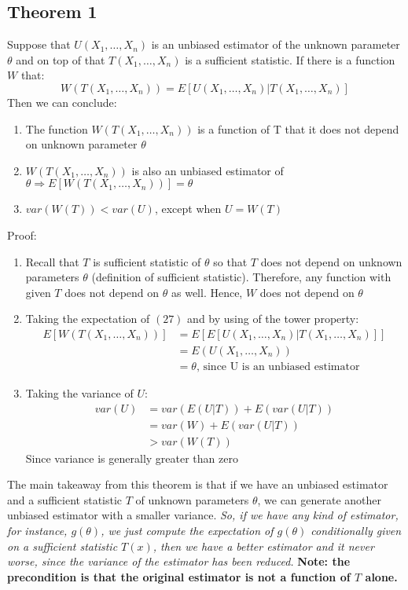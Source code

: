 \documentclass[12pt ]{article}
\begin{document}
\subsection{Theorem 1}
Suppose that $U(X_{1}, \ldots, X_{n})$ is an unbiased estimator of the unknown parameter $\theta$ and on top of that $T(X_{1}, \ldots, X_{n})$ is a sufficient statistic. If there is a function $W$ that:
\begin{equation}
W(T(X_{1}, \ldots, X_{n})) = E[U(X_{1}, \ldots, X_{n}) | T(X_{1}, \ldots, X_{n})]
\end{equation}
Then we can conclude:
\begin{enumerate}
\item The function $W(T(X_{1}, \ldots, X_{n}))$ is a function of T that it does not depend on unknown parameter $\theta$
\item $W(T(X_{1}, \ldots, X_{n}))$ is also an unbiased estimator of $\theta \Rightarrow E[W(T(X_{1}, \ldots, X_{n}))] = \theta$
\item $var(W(T)) < var(U)$, except when $U = W(T)$
\end{enumerate}
Proof:
\begin{enumerate}
\item Recall that $T$ is sufficient statistic of $\theta$ so that $T$ does not depend on unknown parameters $\theta$ (definition of sufficient statistic). Therefore, any function with given $T$ does not depend on $\theta$ as well. Hence, $W$ does not depend on $\theta$
\item Taking the expectation of $(27)$ and by using of the tower property:
\begin{align*}
E[W(T(X_{1}, \ldots, X_{n}))] &= E[E[U(X_{1}, \ldots, X_{n}) | T(X_{1}, \ldots, X_{n})]] \\
&= E(U(X_{1}, \ldots, X_{n})) \\
&= \theta \text{,   since U is an unbiased estimator}
\end{align*}
\item Taking the variance of $U$:
\begin{align*}
var(U) &= var(E(U|T)) + E(var(U|T))\\
&= var(W) + E(var(U|T)) \\
&> var(W(T))
\end{align*}
Since variance is generally greater than zero
\end{enumerate}
The main takeaway from this theorem is that if we have an unbiased estimator and a sufficient statistic $T$ of unknown parameters $\theta$, we can generate another unbiased estimator with a smaller variance. \textit{So, if we have any kind of estimator, for instance, $g(\theta)$, we just compute the expectation of $g(\theta)$ conditionally given on a sufficient statistic $T(x)$, then we have a better estimator and it never worse, since the variance of the estimator has been reduced.} \textbf{Note: the precondition is that the original estimator is not a function of $T$ alone.}
\end{document}
